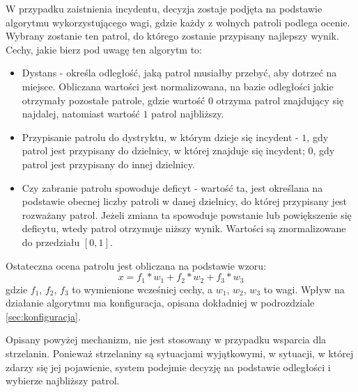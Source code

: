 \par W przypadku zaistnienia incydentu, decyzja zostaje podjęta na podstawie algorytmu wykorzystującego wagi, gdzie każdy z wolnych patroli podlega ocenie. Wybrany zostanie ten patrol, do którego zostanie przypisany najlepszy wynik. Cechy, jakie bierz pod uwagę ten algorytm to:
\begin{itemize}
    \item Dystans - określa odległość, jaką patrol musiałby przebyć, aby dotrzeć na miejsce. Obliczana wartości jest normalizowana, na bazie odległości jakie otrzymały pozostałe patrole, gdzie wartość $0$ otrzyma patrol znajdujący się najdalej, natomiast wartość $1$ patrol najbliższy.
    \item Przypisanie patrolu do dystryktu, w którym dzieje się incydent - $1$, gdy patrol jest przypisany do dzielnicy, w której znajduje się incydent; $0$, gdy patrol jest przypisany do innej dzielnicy.
    \item Czy zabranie patrolu spowoduje deficyt - wartość ta, jest określana na podstawie obecnej liczby patroli w danej dzielnicy, do której przypisany jest rozważany patrol. Jeżeli zmiana ta spowoduje powstanie lub powiększenie się deficytu, wtedy patrol otrzymuje niższy wynik. Wartości są znormalizowane do przedziału $[0,1]$. 
\end{itemize}

\par Ostateczna ocena patrolu jest obliczana na podstawie wzoru:
$$
x = f_1*w_1+f_2*w_2+f_3*w_3
$$
gdzie $f_1$, $f_2$, $f_3$ to wymienione wcześniej cechy, a $w_1$, $w_2$, $w_3$ to wagi. Wpływ na działanie algorytmu ma konfiguracja, opisana dokładniej w podrozdziale \ref{sec:konfiguracja}.

\par Opisany powyżej mechanizm, nie jest stosowany w przypadku wsparcia dla strzelanin. Ponieważ strzelaniny są sytuacjami wyjątkowymi, w sytuacji, w której zdarzy się jej pojawienie, system podejmie decyzję na podstawie odległości i wybierze najbliższy patrol.